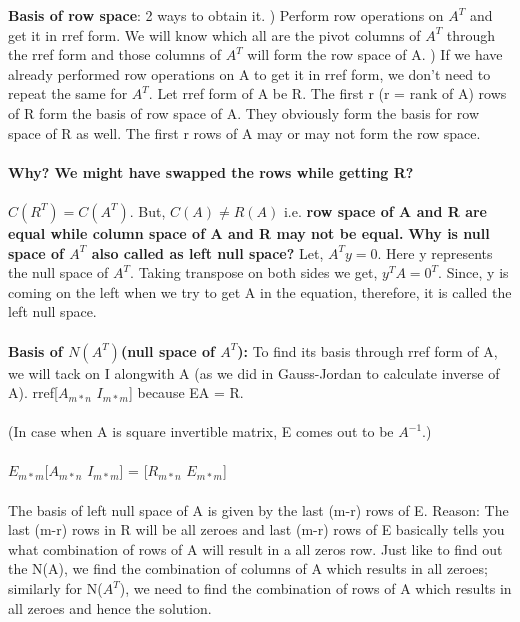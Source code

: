 \documentclass{article}
\begin{document}
\begin{enumerate}
\textbf{Basis of row space}: 2 ways to obtain it. 
) Perform row operations on $A^T$ and get it in rref form. We will know which all are the pivot columns of $A^T$ through the rref form and those columns of $A^T$ will form the row space of A.
) If we have already performed row operations on A to get it in rref form, we don't need to repeat the same for $A^T$. Let rref form of A be R. 
The first r (r = rank of A) rows of R form the basis of row space of A. They obviously form the basis for row space of R as well. 
\newline
The first r rows of A may or may not form the row space. 
\\~\\
\textbf{Why? We might have swapped the rows while getting R?}
\\~\\
 \textbf{$C(R^T) = C(A^T)$}. 
But, \textbf{$C(A)  \neq R(A) $  } 
i.e.  \textbf{row space of A and R are equal while column space of A and R may not be equal.}
\newline
\textbf{Why is null space of $A^T$ also called as left null space? }
\newline
Let, $A^Ty = 0$. Here y represents the null space of $A^T$. Taking transpose on both sides we get, $y^TA = 0^T$. Since, y is coming on the left when we try to get A in the equation, therefore, it is called the left null space.
\\~\\
\textbf{Basis of $N(A^T)$(null space of $A^T$):}
To find its basis through rref form of A, we will tack on I alongwith A (as we did in Gauss-Jordan to calculate inverse of A). 
\newline
rref[$A_{m*n}$  $I_{m*m}$] \rightarrow [$R_{m*n}$ $E_{m*m}$]
because EA = R.
\\~\\
(In case when A is square invertible matrix, E comes out to be $A^{-1}$.)
\\~\\
$E_{m*m}$[$A_{m*n}$ $I_{m*m}$] = [$R_{m*n}$ $E_{m*m}$]
\\~\\
The basis of left null space of A is given by the last (m-r) rows of E.
Reason: The last (m-r) rows in R will be all zeroes and last (m-r) rows of E basically tells you what combination of rows of A will result in a all zeros row. Just like to find out the N(A), we find the combination of columns of A which results in all zeroes; similarly for N($A^T$), we need to find the combination of rows of A which results in all zeroes and hence the solution. 




\end{enumerate}
\end{document}
